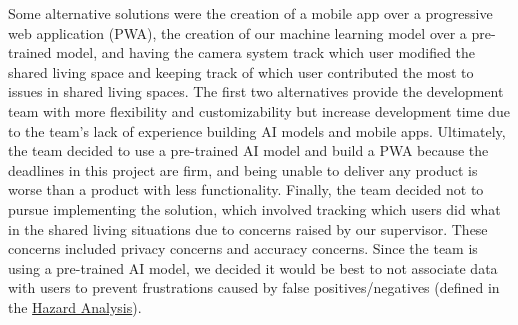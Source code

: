 \documentclass[12pt, titlepage]{article}
\begin{document}
\begin{enumerate}
  Some alternative solutions were the creation of a mobile app over a progressive web application (PWA), the creation of our machine learning model over a pre-trained model, and having the camera system track which user modified the shared living space and keeping track of which user contributed the most to issues in shared living spaces. The first two alternatives provide the development team with more flexibility and customizability but increase development time due to the team's lack of experience building AI models and mobile apps. Ultimately, the team decided to use a pre-trained AI model and build a PWA because the deadlines in this project are firm, and being unable to deliver any product is worse than a product with less functionality. Finally, the team decided not to pursue implementing the solution, which involved tracking which users did what in the shared living situations due to concerns raised by our supervisor. These concerns included privacy concerns and accuracy concerns. Since the team is using a pre-trained AI model, we decided it would be best to not associate data with users to prevent frustrations caused by false positives/negatives (defined in the \href{https://github.com/jinalkast/room8/tree/main/docs/HazardAnalysis}{Hazard Analysis}).
\end{enumerate}
\end{document}
